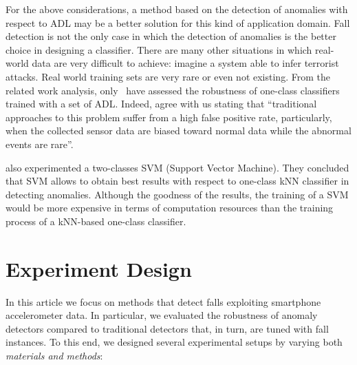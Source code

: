 \documentclass[twocolumn]{svjour3}          \smartqed  \usepackage[draft]{hyperref}
\begin{document}
For the above considerations, a method based on the detection of anomalies with respect to ADL may be a better solution for this kind of application domain. Fall detection is not the only case in which the detection of anomalies is the better choice in designing a classifier. There are many other situations in which real-world data are very difficult to achieve: imagine a system able to infer terrorist attacks. Real world training sets are very rare or even not existing. From the related work analysis, only~\citet{medrano2014} have assessed the robustness of one-class classifiers trained with a set of ADL. Indeed, \citet{medrano2014} agree with us stating that ``traditional approaches to this problem suffer from a high false positive rate, particularly, when the collected sensor data are biased toward normal data while the abnormal events are rare''. 

\citet{medrano2014} also experimented a two-classes SVM (Support Vector Machine). They concluded that SVM allows to obtain best results with respect to one-class kNN classifier in detecting anomalies. Although the goodness of the results,  the training of a SVM would be more expensive in terms of computation resources than the training process of a kNN-based  one-class classifier.

\section{Experiment Design}
\label{sec:ExperimentDesign}

In this article we focus on methods that detect falls exploiting smartphone accelerometer data. In particular, we evaluated the robustness of anomaly detectors compared to traditional detectors that, in turn, are tuned with fall instances. To this end, we designed several experimental setups by varying both \emph{materials and methods}:
\end{document}
